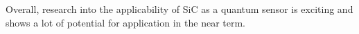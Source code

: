 Overall, research into the applicability of SiC as a quantum sensor is exciting and shows a lot of potential for application in the near term. 





